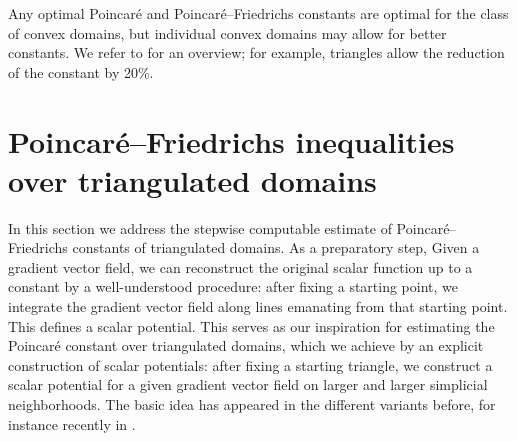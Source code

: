\documentclass[10pt,letterpaper]{article}
\newcommand{\notice}[1]{\textcolor{red}{REMARK: #1}}
\begin{document}
\begin{remark}
\end{remark}


\begin{remark}
    Any optimal Poincar\'e and Poincar\'e--Friedrichs constants are optimal for the class of convex domains, 
    but individual convex domains may allow for better constants.
    We refer to \cite{matculevich2016explicit} for an overview;
    for example, triangles allow the reduction of the constant by 20\%.
\end{remark}









\section{Poincar\'e--Friedrichs inequalities over triangulated domains}\label{section:gradient}

In this section we address the stepwise computable estimate of Poincar\'e--Friedrichs constants of triangulated domains. As a preparatory step, 
Given a gradient vector field, we can reconstruct the original scalar function up to a constant by a well-understood procedure: after fixing a starting point, we integrate the gradient vector field along lines emanating from that starting point. This defines a scalar potential. 
This serves as our inspiration for estimating the Poincar\'e constant over triangulated domains, which we achieve by an explicit construction of scalar potentials: 
after fixing a starting triangle, we construct a scalar potential for a given gradient vector field on larger and larger simplicial neighborhoods. 
The basic idea has appeared in the different variants before, for instance recently in \cite{Ern_Voh_p_rob_3D_20, Chaum_Voh_p_rob_3D_H_curl_23, Voh_loc_glob_H1_24}.
\\
\end{document}
